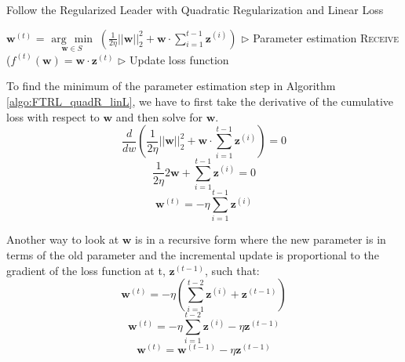 \documentclass[11pt]{article}
\newcommand{\argmin}[1]{\underset{#1}{\operatorname{arg}\,\operatorname{min}}\;}
\begin{document}
\begin{algorithm}[H]
\caption{Follow the Regularized Leader with Quadratic Regularization and Linear Loss}
\label{algo:FTRL_quadR_linL}
\begin{algorithmic}[1]

    \STATE $\bm{w}^{(t)}$ = $\argmin{\bm{w} \in S} (\frac{1}{2\eta}||\bm{w}||^2_2 + \bm{w}\cdot\sum^{t-1}_{i=1} \bm{z}^{(i)})$ \hfill $\triangleright$ Parameter estimation
    \STATE \textsc{Receive} ($f^{(t)}(\bm{w}) = \bm{w}\cdot\bm{z}^{(t)}$ \hfill $\triangleright$ Update loss function
\ENDFOR

\end{algorithmic}
\end{algorithm}

To find the minimum of the parameter estimation step in Algorithm \ref{algo:FTRL_quadR_linL}, we have to first take the derivative of the cumulative loss with respect to $\bm{w}$ and then solve for $\bm{w}$.
\begin{equation*}
\frac{d}{dw}(\frac{1}{2\eta}||\bm{w}||^2_2 + \bm{w}\cdot\sum^{t-1}_{i=1} \bm{z}^{(i)}) = 0
\end{equation*}
\begin{equation*}
\frac{1}{2\eta}2\bm{w} + \sum^{t-1}_{i=1} \bm{z}^{(i)} = 0
\end{equation*}
\begin{equation*}
\bm{w}^{(t)} = -\eta \sum^{t-1}_{i=1} \bm{z}^{(i)}
\end{equation*}

Another way to look at $\bm{w}$ is in a recursive form where the new parameter is in terms of the old parameter and the incremental update is proportional to the gradient of the loss function at t, $\bm{z}^{(t-1)}$, such that:
\begin{equation*}
\bm{w}^{(t)} =  -\eta (\sum^{t-2}_{i=1} \bm{z}^{(i)} + \bm{z}^{(t-1)})
\end{equation*}
\begin{equation*}
\bm{w}^{(t)} =  -\eta \sum^{t-2}_{i=1} \bm{z}^{(i)} - \eta \bm{z}^{(t-1)}
\end{equation*}
\begin{equation*}
\bm{w}^{(t)} =  \bm{w}^{(t-1)} - \eta \bm{z}^{(t-1)}
\end{equation*}
\end{document}
